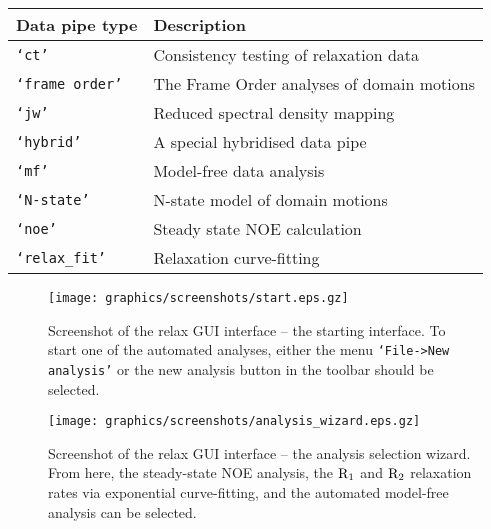 \begin{center}
\begin{tabular}{ll}
\toprule

Data pipe type          & Description \\

\midrule

\texttt{`ct'}           & Consistency testing of relaxation data \\
\texttt{`frame order'}  & The Frame Order analyses of domain motions \\
\texttt{`jw'}           & Reduced spectral density mapping \\
\texttt{`hybrid'}       & A special hybridised data pipe \\
\texttt{`mf'}           & Model-free data analysis \\
\texttt{`N-state'}      & N-state model of domain motions \\
\texttt{`noe'}          & Steady state NOE calculation \\
\texttt{`relax\_fit'}   & Relaxation curve-fitting \\

\bottomrule
\end{tabular}
\end{center}


\begin{figure}
\centerline{\texttt{[image: graphics/screenshots/start.eps.gz]}}
\caption[GUI screenshot]{Screenshot of the relax GUI interface -- the starting interface.  To start one of the automated analyses, either the menu \texttt{`File->New analysis'} or the new analysis button in the toolbar should be selected.}\label{fig: GUI screenshot - start}
\end{figure}

\begin{figure}
\centerline{\texttt{[image: graphics/screenshots/analysis\_wizard.eps.gz]}}
\caption[GUI screenshot -- Analysis wizard screenshot]{Screenshot of the relax GUI interface -- the analysis selection wizard.  From here, the steady-state NOE analysis, the $\mathrm{R}_1$ and $\mathrm{R}_2$ relaxation rates via exponential curve-fitting, and the automated model-free analysis can be selected.}\label{fig: screenshot: analysis wizard}
\end{figure}




